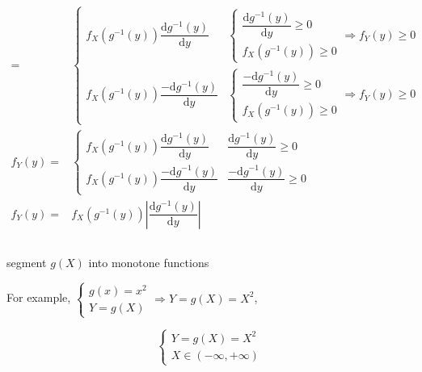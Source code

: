 \documentclass[
]{book}
\theoremstyle{definition}
\theoremstyle{definition}
\theoremstyle{definition}
\theoremstyle{definition}
\theoremstyle{remark}
\begin{document}
\[\begin{aligned}
= & \begin{cases}
f_{{\scriptscriptstyle X}}\left(g^{-1}\left(y\right)\right)\dfrac{\mathrm{d}g^{-1}\left(y\right)}{\mathrm{d}y} & \begin{cases}
\dfrac{\mathrm{d}g^{-1}\left(y\right)}{\mathrm{d}y}\ge0\\
f_{{\scriptscriptstyle X}}\left(g^{-1}\left(y\right)\right)\ge0
\end{cases}\Rightarrow f_{{\scriptscriptstyle Y}}\left(y\right)\ge0\\
f_{{\scriptscriptstyle X}}\left(g^{-1}\left(y\right)\right)\dfrac{-\mathrm{d}g^{-1}\left(y\right)}{\mathrm{d}y} & \begin{cases}
\dfrac{-\mathrm{d}g^{-1}\left(y\right)}{\mathrm{d}y}\ge0\\
f_{{\scriptscriptstyle X}}\left(g^{-1}\left(y\right)\right)\ge0
\end{cases}\Rightarrow f_{{\scriptscriptstyle Y}}\left(y\right)\ge0
\end{cases}\\
f_{{\scriptscriptstyle Y}}\left(y\right)= & \begin{cases}
f_{{\scriptscriptstyle X}}\left(g^{-1}\left(y\right)\right)\dfrac{\mathrm{d}g^{-1}\left(y\right)}{\mathrm{d}y} & \dfrac{\mathrm{d}g^{-1}\left(y\right)}{\mathrm{d}y}\ge0\\
f_{{\scriptscriptstyle X}}\left(g^{-1}\left(y\right)\right)\dfrac{-\mathrm{d}g^{-1}\left(y\right)}{\mathrm{d}y} & \dfrac{-\mathrm{d}g^{-1}\left(y\right)}{\mathrm{d}y}\ge0
\end{cases}\\
f_{{\scriptscriptstyle Y}}\left(y\right)= & f_{{\scriptscriptstyle X}}\left(g^{-1}\left(y\right)\right)\left|\dfrac{\mathrm{d}g^{-1}\left(y\right)}{\mathrm{d}y}\right|
\end{aligned}
\]

\[
\tag*{$\Box$}
\]

segment \(g\left(X\right)\) into monotone functions

For example, \(\begin{cases} g\left(x\right)=x^{2}\\ Y=g\left(X\right) \end{cases}\Rightarrow Y=g\left(X\right)=X^{2}\),

\[
\begin{cases}
Y=g\left(X\right)=X^{2}\\
X\in\left(-\infty,+\infty\right)
\end{cases}
\]
\end{document}
